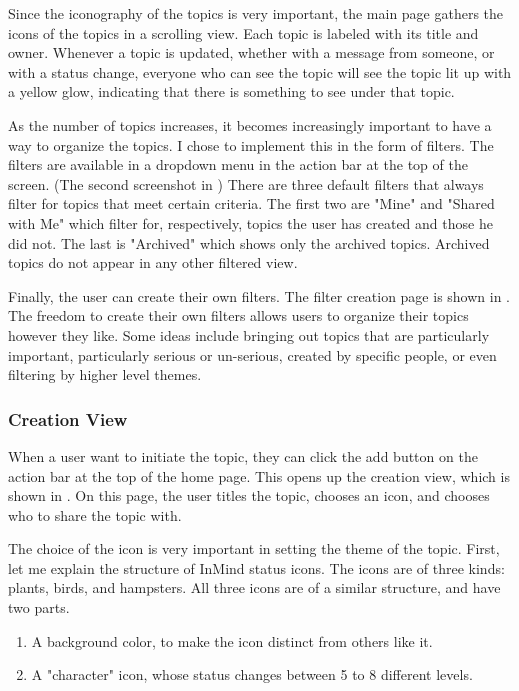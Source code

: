      Since the iconography of the topics is very important,
      the main page gathers the icons of the topics in a scrolling view.
      Each topic is labeled with its title and owner.
      Whenever a topic is updated, whether with a message from someone,
      or with a status change, everyone who can see the topic will see the topic
      lit up with a yellow glow, indicating that there is something to see under that topic.

      As the number of topics increases,
      it becomes increasingly important to have a way to organize the topics.
      I chose to implement this in the form of filters.
      The filters are available in a dropdown menu in the action bar at the top of the screen.
      (The second screenshot in \cite{})
      There are three default filters that always filter for topics that meet certain criteria.
      The first two are "Mine" and "Shared with Me"
      which filter for, respectively, topics the user has created and those he did not.
      The last is "Archived" which shows only the archived topics.
      Archived topics do not appear in any other filtered view.

      Finally, the user can create their own filters.
      The filter creation page is shown in \cite{}.
      The freedom to create their own filters allows users to organize
      their topics however they like.
      Some ideas include bringing out topics that are particularly important,
      particularly serious or un-serious, created by specific people,
      or even filtering by higher level themes.

      \subsubsection{Creation View}
      When a user want to initiate the topic,
      they can click the add button on the action bar at the top of the home page.
      This opens up the creation view, which is shown in \cite{}.
      On this page, the user titles the topic,
      chooses an icon, and chooses who to share the topic with.

      The choice of the icon is very important in setting the theme of the topic.
      First, let me explain the structure of InMind status icons.
      The icons are of three kinds: plants, birds, and hampsters.
      All three icons are of a similar structure, and have two parts.
      \begin{enumerate}
      \item A background color, to make the icon distinct from others like it.
      \item A "character" icon, whose status changes between 5 to 8 different levels.
      \end{enumerate}

